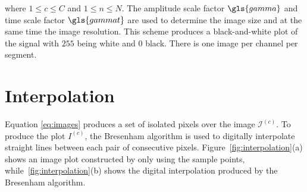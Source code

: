 \noindent  where  $1 \leq c \leq C$ and $1 \leq n \leq N$. The amplitude scale factor $\gls{gamma}$ and time scale factor $\gls{gammat}$ are used to determine the image size and at the same time the image resolution. This scheme produces a black-and-white plot of the signal with $255$ being white and $0$ black.  There is one image per channel per segment. 


\section{Interpolation}

Equation \ref{eq:images} produces a set of isolated pixels over the image $\mathcal{I}^{(c)}$.  To produce the plot $I^{(c)}$, the Bresenham \cite{Bresenham1965,Ramele2016} algorithm is used to digitally interpolate straight lines between each pair of consecutive pixels.  Figure~\ref{fig:interpolation}(a) shows an image plot constructed by only using the sample points, while~\ref{fig:interpolation}(b) shows the digital interpolation produced by the Bresenham algorithm.

